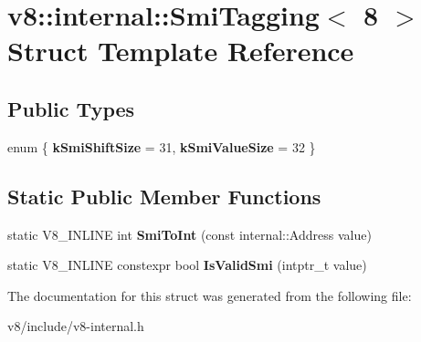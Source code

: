 \hypertarget{structv8_1_1internal_1_1SmiTagging_3_018_01_4}{}\section{v8\+:\+:internal\+:\+:Smi\+Tagging$<$ 8 $>$ Struct Template Reference}
\label{structv8_1_1internal_1_1SmiTagging_3_018_01_4}
\subsection*{Public Types}
\begin{DoxyCompactItemize}
\item 
\mbox{\label{structv8_1_1internal_1_1SmiTagging_3_018_01_4_aec48ea556ba2a9534a5ed83443a53764}} 
enum \{ {\bfseries k\+Smi\+Shift\+Size} = 31, 
{\bfseries k\+Smi\+Value\+Size} = 32
 \}
\end{DoxyCompactItemize}
\subsection*{Static Public Member Functions}
\begin{DoxyCompactItemize}
\item 
\mbox{\label{structv8_1_1internal_1_1SmiTagging_3_018_01_4_a3d0223bc60d1cc83f7931b298bedb335}} 
static V8\+\_\+\+I\+N\+L\+I\+NE int {\bfseries Smi\+To\+Int} (const internal\+::\+Address value)
\item 
\mbox{\label{structv8_1_1internal_1_1SmiTagging_3_018_01_4_aba20851b9b3a19360435f2afb05d4aaf}} 
static V8\+\_\+\+I\+N\+L\+I\+NE constexpr bool {\bfseries Is\+Valid\+Smi} (intptr\+\_\+t value)
\end{DoxyCompactItemize}


The documentation for this struct was generated from the following file\+:\begin{DoxyCompactItemize}
\item 
v8/include/v8-\/internal.\+h\end{DoxyCompactItemize}

